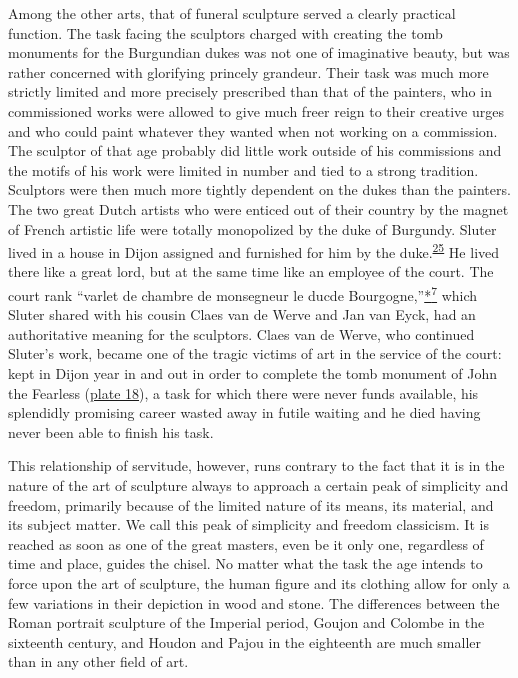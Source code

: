 Among the other arts, that of funeral sculpture served a clearly
practical function. The task facing the sculptors charged with creating
the tomb monuments for the Burgundian dukes was not one of imaginative
beauty, but was rather concerned with glorifying princely grandeur.
Their task was much more strictly limited and more precisely prescribed
than that of the painters, who in commissioned works were allowed to
give much freer reign to their creative urges and who could paint
whatever they wanted when not working on a commission. The sculptor of
that age probably did little work outside of his commissions and the
motifs of his work were limited in number and tied to a strong
tradition. Sculptors were then much more tightly dependent on the dukes
than the painters. The two great Dutch artists who were enticed out of
their country by the magnet of French artistic life were totally
monopolized by the duke of Burgundy. Sluter lived in a house in Dijon
assigned and furnished for him by the
duke.\textsuperscript{\protect\hypertarget{20_ILLUSTRATIONS_FOLLOW_PAGE.xhtmlux5cux23id_423}{\protect\hyperlink{23_NOTES.xhtmlux5cux23id_424}{25}}}
He lived there like a great lord, but at the same time like an employee
of the court. The court rank ``varlet de chambre de monsegneur le
duc\protect\hypertarget{20_ILLUSTRATIONS_FOLLOW_PAGE.xhtmlux5cux23page_308}{}{}de
Bourgogne,''\protect\hypertarget{20_ILLUSTRATIONS_FOLLOW_PAGE.xhtmlux5cux23id_2667}{\protect\hyperlink{23_NOTES.xhtmlux5cux23id_2668}{*\textsuperscript{7}}}
which Sluter shared with his cousin Claes van de Werve and Jan van Eyck,
had an authoritative meaning for the sculptors. Claes van de Werve, who
continued Sluter's work, became one of the tragic victims of art in the
service of the court: kept in Dijon year in and out in order to complete
the tomb monument of John the Fearless
(\protect\hyperlink{20_ILLUSTRATIONS_FOLLOW_PAGE.xhtmlux5cux23id_18}{plate
18}), a task for which there were never funds available, his splendidly
promising career wasted away in futile waiting and he died having never
been able to finish his task.

This relationship of servitude, however, runs contrary to the fact that
it is in the nature of the art of sculpture always to approach a certain
peak of simplicity and freedom, primarily because of the limited nature
of its means, its material, and its subject matter. We call this peak of
simplicity and freedom classicism. It is reached as soon as one of the
great masters, even be it only one, regardless of time and place, guides
the chisel. No matter what the task the age intends to force upon the
art of sculpture, the human figure and its clothing allow for only a few
variations in their depiction in wood and stone. The differences between
the Roman portrait sculpture of the Imperial period, Goujon and Colombe
in the sixteenth century, and Houdon and Pajou in the eighteenth are
much smaller than in any other field of art.

